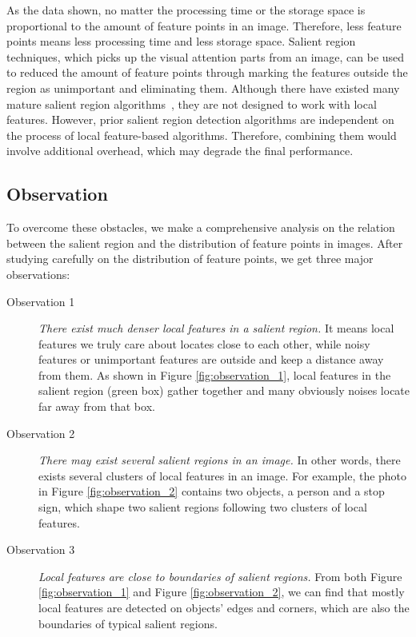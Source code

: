 As the data shown, no matter the processing time or the storage space is proportional to the amount of feature points in an image. Therefore, less feature points means  less processing time and less storage space. Salient region techniques, which picks up the visual attention parts from an image, can be used to reduced the amount of feature points through marking the features outside the region as unimportant and eliminating them. Although there have existed many mature salient region algorithms~\cite{cheng2011global,achanta2009frequency,itti1998model}, they are not designed to work with local features. However, prior salient region detection algorithms are independent on the process of local feature-based algorithms. Therefore,  combining them would involve additional overhead, which may degrade the final performance.

\subsection{Observation}
\label{subsec:observation}

To overcome these obstacles, we make a comprehensive analysis on the relation between the salient region and the distribution of feature points  in images. After studying carefully on the distribution of feature points, we get three major observations:

\begin{description}
	
\item[Observation 1]  \textit{There exist much denser local features in a salient region.} It means local features we truly care about locates close to each other, while noisy features or unimportant features are outside and keep a distance away from them. As shown in Figure \ref{fig:observation_1}, local features in the salient region (green box) gather together and many obviously noises locate far away from that box. 

\item[Observation 2]  \textit{There may exist several salient regions in an image.} In other words, there exists several clusters of local features in an image. For example, the photo in Figure \ref{fig:observation_2} contains two objects, a person and a stop sign, which shape two salient regions following two clusters of local features.

\item[Observation 3]  \textit{Local features are close to boundaries of salient regions.} From both Figure \ref{fig:observation_1} and Figure \ref{fig:observation_2}, we can find that mostly local features are detected on objects' edges and corners, which are also the boundaries of typical salient regions. 

\end{description}

